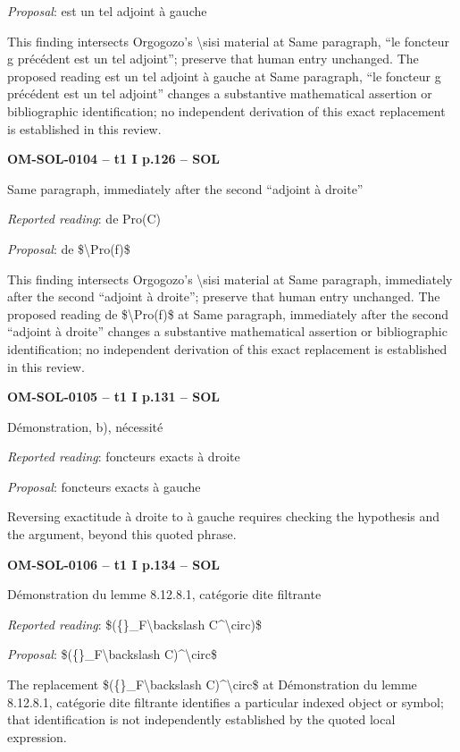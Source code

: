 \emph{Proposal}: est un tel adjoint à gauche\par
This finding intersects Orgogozo's \textbackslash{}sisi material at Same paragraph, “le foncteur g précédent est un tel adjoint”; preserve that human entry unchanged. The proposed reading est un tel adjoint à gauche at Same paragraph, “le foncteur g précédent est un tel adjoint” changes a substantive mathematical assertion or bibliographic identification; no independent derivation of this exact replacement is established in this review.\par
\par\noindent\textbf{OM-SOL-0104 -- t1 I p.126 -- SOL}\par
Same paragraph, immediately after the second “adjoint à droite”\par
\emph{Reported reading}: de Pro(C)\par
\emph{Proposal}: de \$\textbackslash{}Pro(f)\$\par
This finding intersects Orgogozo's \textbackslash{}sisi material at Same paragraph, immediately after the second “adjoint à droite”; preserve that human entry unchanged. The proposed reading de \$\textbackslash{}Pro(f)\$ at Same paragraph, immediately after the second “adjoint à droite” changes a substantive mathematical assertion or bibliographic identification; no independent derivation of this exact replacement is established in this review.\par
\par\noindent\textbf{OM-SOL-0105 -- t1 I p.131 -- SOL}\par
Démonstration, b), nécessité\par
\emph{Reported reading}: foncteurs exacts à droite\par
\emph{Proposal}: foncteurs exacts à gauche\par
Reversing exactitude à droite to à gauche requires checking the hypothesis and the argument, beyond this quoted phrase.\par
\par\noindent\textbf{OM-SOL-0106 -- t1 I p.134 -- SOL}\par
Démonstration du lemme 8.12.8.1, catégorie dite filtrante\par
\emph{Reported reading}: \$(\{\}\_F\textbackslash{}backslash C\textasciicircum{}\textbackslash{}circ)\$\par
\emph{Proposal}: \$(\{\}\_F\textbackslash{}backslash C)\textasciicircum{}\textbackslash{}circ\$\par
The replacement \$(\{\}\_F\textbackslash{}backslash C)\textasciicircum{}\textbackslash{}circ\$ at Démonstration du lemme 8.12.8.1, catégorie dite filtrante identifies a particular indexed object or symbol; that identification is not independently established by the quoted local expression.\par
